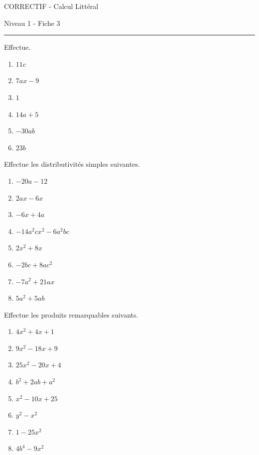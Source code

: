 \documentclass[12pt,parskip=half-, twoside=semi]{scrartcl}
\begin{document}

\begin{center}
  \bfseries
  \begin{Huge}
    CORRECTIF - Calcul Littéral
  \end{Huge}
  \smallbreak
  \begin{large}
    Niveau 1  - Fiche 3
  \end{large}
  \smallbreak
  \rule[10pt]{.5\linewidth}{1 pt}
\end{center}

\setcounter{exercise}{0}
\begin{exercise}Effectue.
  \begin{enumerate}[cols=3]
      \item \(11c\)
      \item \(7ax-9\)
      \item \(1\)
      \item \(14a+5\)
      \item \(-30ab\)
      \item \(23b\)
  \end{enumerate}
\end{exercise}

\begin{exercise}Effectue les distributivités simples suivantes.
  \begin{enumerate}[cols=2]
    \item $-20a-12$
    \item $2ax-6x$
    \item $-6x+4a$
    \item $-14a^2cx^2-6a^2bc$
    \item $2x^2+8x$
    \item $-2bc+8ac^2$
    \item $-7a^2+21ax$
    \item $5a^2+5ab$
  \end{enumerate}
\end{exercise}

\begin{exercise}Effectue les produits remarquables suivants.
  \begin{enumerate}[cols=2]
    \item $4x^2+4x+1$
    \item $9x^2-18x+9$
    \item $25x^2-20x+4$
    \item $b^2+2ab+a^2$
    \item $x^2-10x+25$
    \item $y^2-x^2$
    \item $1-25x^2$
    \item $4b^4-9x^2$
  \end{enumerate}
\end{exercise}
\end{document}

